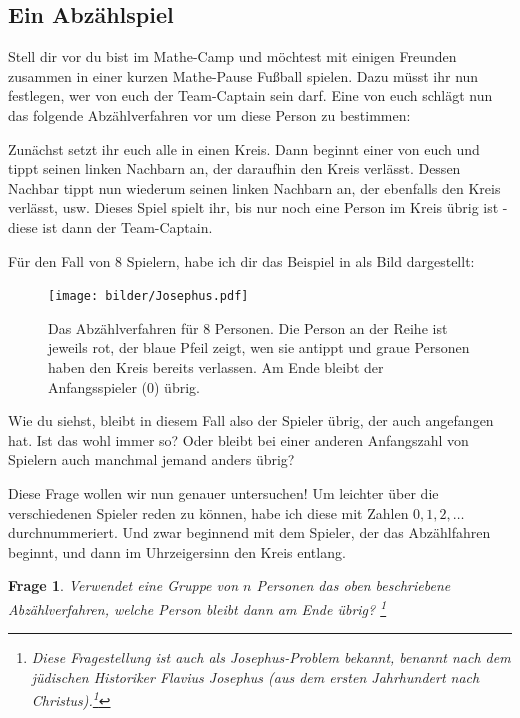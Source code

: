 \documentclass[a4paper,ngerman,12pt]{scrartcl}
\theoremstyle{definition}
\theoremstyle{plain}
\newtheorem{frage}[defn]{Frage}
\theoremstyle{remark}
\begin{document}
\subsection{Ein Abzählspiel}

Stell dir vor du bist im Mathe-Camp und möchtest mit einigen Freunden zusammen in einer kurzen Mathe-Pause Fußball spielen. Dazu müsst ihr nun festlegen, wer von euch der Team-Captain sein darf. Eine von euch schlägt nun das folgende Abzählverfahren vor um diese Person zu bestimmen:

Zunächst setzt ihr euch alle in einen Kreis. Dann beginnt einer von euch und tippt seinen linken Nachbarn an, der daraufhin den Kreis verlässt. Dessen Nachbar tippt nun wiederum seinen linken Nachbarn an, der ebenfalls den Kreis verlässt, usw. Dieses Spiel spielt ihr, bis nur noch eine Person im Kreis übrig ist - diese ist dann der Team-Captain.

Für den Fall von $8$ Spielern, habe ich dir das Beispiel in  als Bild dargestellt:

\begin{figure}[h]\centering
	\texttt{[image: bilder/Josephus.pdf]}
	\caption{Das Abzählverfahren für $8$ Personen. Die Person an der Reihe ist jeweils rot, der blaue Pfeil zeigt, wen sie antippt und graue Personen haben den Kreis bereits verlassen. Am Ende bleibt der Anfangsspieler ($0$) übrig.}
	\label{Abb:JosephusBsp}
\end{figure}

Wie du siehst, bleibt in diesem Fall also der Spieler übrig, der auch angefangen hat. Ist das wohl immer so? Oder bleibt bei einer anderen Anfangszahl von Spielern auch manchmal jemand anders übrig? 

Diese Frage wollen wir nun genauer untersuchen! Um leichter über die verschiedenen Spieler reden zu können, habe ich diese mit Zahlen $0, 1, 2, \dots$ durchnummeriert. Und zwar beginnend mit dem Spieler, der das Abzählfahren beginnt, und dann im Uhrzeigersinn den Kreis entlang.

\begin{frage}
	Verwendet eine Gruppe von $n$ Personen das oben beschriebene Abzählverfahren, welche Person bleibt dann am Ende übrig?
	\footnote{Diese Fragestellung ist auch als Josephus-Problem bekannt, benannt nach dem jüdischen Historiker Flavius Josephus (aus dem ersten Jahrhundert nach Christus).\footnote{Hilfe}}
\end{frage}
\end{document}
